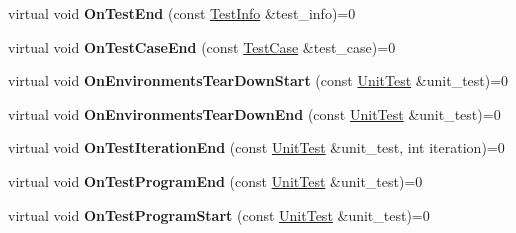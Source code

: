 \begin{DoxyCompactItemize}
\item 
\hypertarget{classtesting_1_1_test_event_listener_abb1c44525ef038500608b5dc2f17099b}{}virtual void {\bfseries On\+Test\+End} (const \hyperlink{classtesting_1_1_test_info}{Test\+Info} \&test\+\_\+info)=0\label{classtesting_1_1_test_event_listener_abb1c44525ef038500608b5dc2f17099b}

\item 
\hypertarget{classtesting_1_1_test_event_listener_ae61985e2ef76ac78379b077be57a9c36}{}virtual void {\bfseries On\+Test\+Case\+End} (const \hyperlink{classtesting_1_1_test_case}{Test\+Case} \&test\+\_\+case)=0\label{classtesting_1_1_test_event_listener_ae61985e2ef76ac78379b077be57a9c36}

\item 
\hypertarget{classtesting_1_1_test_event_listener_a468b5e6701bcb86cb2c956caadbba5e4}{}virtual void {\bfseries On\+Environments\+Tear\+Down\+Start} (const \hyperlink{classtesting_1_1_unit_test}{Unit\+Test} \&unit\+\_\+test)=0\label{classtesting_1_1_test_event_listener_a468b5e6701bcb86cb2c956caadbba5e4}

\item 
\hypertarget{classtesting_1_1_test_event_listener_a9ea04fa7f447865ba76df35e12ba2092}{}virtual void {\bfseries On\+Environments\+Tear\+Down\+End} (const \hyperlink{classtesting_1_1_unit_test}{Unit\+Test} \&unit\+\_\+test)=0\label{classtesting_1_1_test_event_listener_a9ea04fa7f447865ba76df35e12ba2092}

\item 
\hypertarget{classtesting_1_1_test_event_listener_a550fdb3e55726e4cefa09f5697941425}{}virtual void {\bfseries On\+Test\+Iteration\+End} (const \hyperlink{classtesting_1_1_unit_test}{Unit\+Test} \&unit\+\_\+test, int iteration)=0\label{classtesting_1_1_test_event_listener_a550fdb3e55726e4cefa09f5697941425}

\item 
\hypertarget{classtesting_1_1_test_event_listener_ad15b6246d94c268e233487a86463ef3d}{}virtual void {\bfseries On\+Test\+Program\+End} (const \hyperlink{classtesting_1_1_unit_test}{Unit\+Test} \&unit\+\_\+test)=0\label{classtesting_1_1_test_event_listener_ad15b6246d94c268e233487a86463ef3d}

\item 
\hypertarget{classtesting_1_1_test_event_listener_a5f6c84f39851e8a603a2d2e10063816b}{}virtual void {\bfseries On\+Test\+Program\+Start} (const \hyperlink{classtesting_1_1_unit_test}{Unit\+Test} \&unit\+\_\+test)=0\label{classtesting_1_1_test_event_listener_a5f6c84f39851e8a603a2d2e10063816b}


\end{DoxyCompactItemize}
